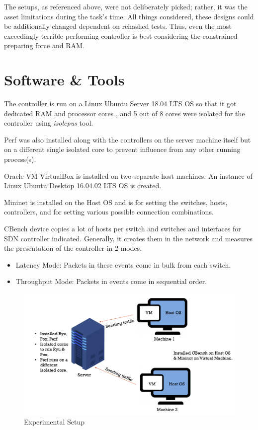 The setups, as referenced above, were not deliberately picked; rather, it was the asset limitations during the task's time. All things considered, these designs could be additionally changed dependent on rehashed tests. Thus, even the most exceedingly terrible performing controller is best considering the constrained preparing force and RAM.

\section{Software \& Tools}
The controller is run on a Linux Ubuntu Server 18.04 LTS OS so that it got dedicated RAM and processor cores \cite{resshare1970}, and 5 out of 8 cores were isolated for the controller using \textit{isolcpus} tool.

Perf was also installed along with the controllers on the server machine itself but on a different single isolated core to prevent influence from any other running process(s).

Oracle VM VirtualBox is installed on two separate host machines. An instance of Linux Ubuntu Desktop 16.04.02 LTS OS is created.

Mininet is installed on the Host OS and is for setting the switches, hosts, controllers, and for setting various possible connection combinations.

CBench device copies a lot of hosts per switch and switches and interfaces for SDN controller indicated. Generally, it creates them in the network and measures the presentation of the controller in 2 modes.
    \begin{itemize}
        \item Latency Mode: Packets in these events come in bulk from each switch.
        \item Throughput Mode: Packets in events come in sequential order.
    \end{itemize}

\begin{figure}[!hbt]
    \centering
        \includegraphics[width=\textwidth,keepaspectratio]{images/setup.png}
       \caption{Experimental Setup}
        \label{experimentalsetup}
\end{figure}

